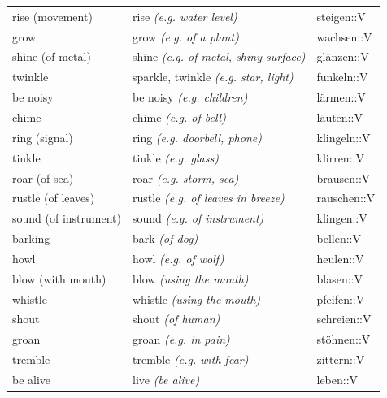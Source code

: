 \begin{center}
\begin{longtable}{lll}
{\sc \lowercase{	RISE \footnotesize (MOVEMENT)	}}	&	rise	\textit{\footnotesize (e.g. water level)}	&	steigen::V	\\
{\sc \lowercase{	GROW	}}	&	grow	\textit{\footnotesize (e.g. of a plant)}	&	wachsen::V	\\
{\sc \lowercase{	SHINE \footnotesize (OF METAL)	}}	&	shine	\textit{\footnotesize (e.g. of metal, shiny surface)}	&	glänzen::V	\\
{\sc \lowercase{	TWINKLE	}}	&	sparkle, twinkle	\textit{\footnotesize (e.g. star, light)}	&	funkeln::V	\\
{\sc \lowercase{	BE NOISY	}}	&	be noisy	\textit{\footnotesize (e.g. children)}	&	lärmen::V	\\
{\sc \lowercase{	CHIME	}}	&	chime	\textit{\footnotesize (e.g. of bell)}	&	läuten::V	\\
{\sc \lowercase{	RING \footnotesize (SIGNAL)	}}	&	ring	\textit{\footnotesize (e.g. doorbell, phone)}	&	klingeln::V	\\
{\sc \lowercase{	TINKLE	}}	&	tinkle	\textit{\footnotesize (e.g. glass)}	&	klirren::V	\\
{\sc \lowercase{	ROAR \footnotesize (OF SEA)	}}	&	roar	\textit{\footnotesize (e.g. storm, sea)}	&	brausen::V	\\
{\sc \lowercase{	RUSTLE \footnotesize (OF LEAVES)	}}	&	rustle	\textit{\footnotesize (e.g. of leaves in breeze)}	&	rauschen::V	\\
{\sc \lowercase{	SOUND \footnotesize (OF INSTRUMENT)	}}	&	sound	\textit{\footnotesize (e.g. of instrument)}	&	klingen::V	\\
{\sc \lowercase{	BARKING	}}	&	bark	\textit{\footnotesize (of dog)}	&	bellen::V	\\
{\sc \lowercase{	HOWL	}}	&	howl	\textit{\footnotesize (e.g. of wolf)}	&	heulen::V	\\
{\sc \lowercase{	BLOW \footnotesize (WITH MOUTH)	}}	&	blow	\textit{\footnotesize (using the mouth)}	&	blasen::V	\\
{\sc \lowercase{	WHISTLE	}}	&	whistle	\textit{\footnotesize (using the mouth)}	&	pfeifen::V	\\
{\sc \lowercase{	SHOUT	}}	&	shout	\textit{\footnotesize (of human)}	&	schreien::V	\\
{\sc \lowercase{	GROAN	}}	&	groan	\textit{\footnotesize (e.g. in pain)}	&	stöhnen::V	\\
{\sc \lowercase{	TREMBLE	}}	&	tremble	\textit{\footnotesize (e.g. with fear)}	&	zittern::V	\\
{\sc \lowercase{	BE ALIVE	}}	&	live	\textit{\footnotesize (be alive)}	&	leben::V	\\

\end{longtable}
\end{center}
